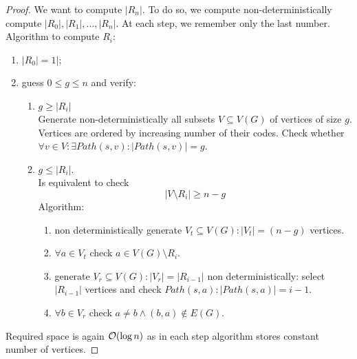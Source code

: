\begin{proof}
	We want to compute $|R_n|$.
	To do so, we compute non-deterministically compute $|R_0|, |R_1|, \ldots, |R_n|$.
	At each step, we remember only the last number.
	Algorithm to compute $R_i$:
	\begin{enumerate}
		\item $|R_0| = 1|$;
		\item guess $0 \leq g \leq n$ and verify:
			\begin{enumerate}
				\item $g \geq |R_i|$\\
					Generate non-deterministically all subsets $V \subseteq V(G)$ of vertices of size $g$.
					Vertices are ordered by increasing number of their codes.
					Check whether $\forall v \in V: \exists Path(s, v): |Path(s, v)| = g$.
				\item $g \leq |R_i|$.\\
					Is equivalent to check
					\[ |V \setminus R_i| \geq n - g \]
					Algorithm:
					\begin{enumerate}
						\item non deterministically generate $V_t \subseteq V(G): |V_t| = (n - g)$ vertices.
						\item $\forall a \in V_t$ check $a \in V(G) \setminus R_i$.
						\item generate $V_r \subseteq V(G): |V_r| = |R_{i - 1}|$ non deterministically: select $|R_{i - 1}|$ vertices and check $Path(s, a): |Path(s, a)| = i - 1$.
						\item $\forall b \in V_r$ check $a \ne b \land (b, a) \notin E(G)$.
					\end{enumerate}
			\end{enumerate}
	\end{enumerate}

	Required space is again $\mathcal{O}(\log n)$ as in each step algorithm stores constant number of vertices.
\end{proof}
